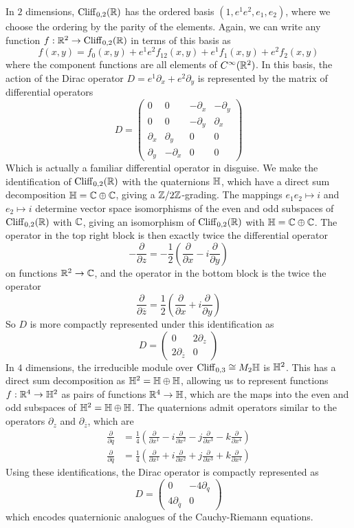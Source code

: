 In $2$ dimensions, $\operatorname{Cliff}_{0,2}(\mathbb{R})$ has the ordered basis $(1, e^1e^2, e_1,e_2)$,
where we choose the ordering by the parity of the elements. Again, we can
write any function $f : \mathbb{R}^2 \to \operatorname{Cliff}_{0,2}(\mathbb{R})$ in terms of this basis
as \[
f(x,y) = f_0(x,y) + e^1e^2f_{12}(x,y) + e^1f_1(x,y) + e^2f_2(x,y)
\]
where the component functions are all elements of $C^\infty(\mathbb{R}^2)$. In this
basis, the action of the Dirac operator $D = e^1\partial_x + e^2\partial_y$
is represented by the matrix of differential operators
\[
D = \begin{pmatrix}
0 & 0 & -\partial_x & -\partial_y \\
0 & 0 & -\partial_y & \partial_x \\
\partial_x & \partial_y & 0 & 0 \\
\partial_y & -\partial_x & 0 & 0
\end{pmatrix}
\]
Which is actually a familiar differential operator in disguise. We make the
identification of $\operatorname{Cliff}_{0,2}(\mathbb{R})$ with the quaternions $\mathbb{H}$, which
have a direct sum decomposition $\mathbb{H} = \mathbb{C} \oplus \mathbb{C}$, giving a $\mathbb{Z}/2\mathbb{Z}$-grading.
The mappings $e_1e_2 \mapsto i$ and $e_2 \mapsto i$ determine vector space
isomorphisms of the even and odd subspaces of $\operatorname{Cliff}_{0,2}(\mathbb{R})$ with $\mathbb{C}$,
giving an isomorphism of $\operatorname{Cliff}_{0,2}(\mathbb{R})$ with $\mathbb{H} = \mathbb{C} \oplus \mathbb{C}$. The
operator in the top right block is then exactly twice the differential operator
\[
-\frac{\partial}{\partial z} = -\frac{1}{2}\left( \frac{\partial}{\partial x}
- i \frac{\partial}{\partial y}\right)
\]
on functions $\mathbb{R}^2 \to \mathbb{C}$, and the operator in the bottom block is the twice
the operator
\[
\frac{\partial}{\partial \overline{z}} = \frac{1}{2}\left( \frac{\partial}{\partial x}
+ i \frac{\partial}{\partial y}\right)
\]
So $D$ is more compactly represented under this identification as
\[
D = \begin{pmatrix}
0 & 2\partial_z \\
2\partial_{\overline{z}} & 0
\end{pmatrix}
\]
In $4$ dimensions, the irreducible module over $\operatorname{Cliff}_{0,3} \cong M_2\mathbb{H}$ is
$\mathbb{H}^2$. This has a direct sum decomposition as $\mathbb{H}^2 = \mathbb{H} \oplus \mathbb{H}$, allowing
us to represent functions $f : \mathbb{R}^4 \to \mathbb{H}^2$ as pairs of functions $\mathbb{R}^4 \to \mathbb{H}$,
which are the maps into the even and odd subspaces of $\mathbb{H}^2 = \mathbb{H} \oplus \mathbb{H}$.
The quaternions admit operators similar to the operators $\partial_z$ and
$\partial_{\overline{z}}$, which are
%
\begin{align*}
\frac{\partial}{\partial q} &= \frac{1}{4}\left( \frac{\partial}{\partial x^1}
- i \frac{\partial}{\partial x^2} - j\frac{\partial}{\partial x^3}
- k \frac{\partial}{\partial x^4}\right) \\[5pt]
\frac{\partial}{\partial \overline{q}} &= \frac{1}{4}\left( \frac{\partial}{\partial x^1}
+ i \frac{\partial}{\partial x^2} + j\frac{\partial}{\partial x^3}
+ k \frac{\partial}{\partial x^4}\right)
\end{align*}
%
Using these identifications, the Dirac operator is compactly represented as
\[
D = \begin{pmatrix}
0 & -4\partial_q \\
4\partial_{\overline{q}} & 0
\end{pmatrix}
\]
which encodes quaternionic analogues of the Cauchy-Riemann equations.
%
%